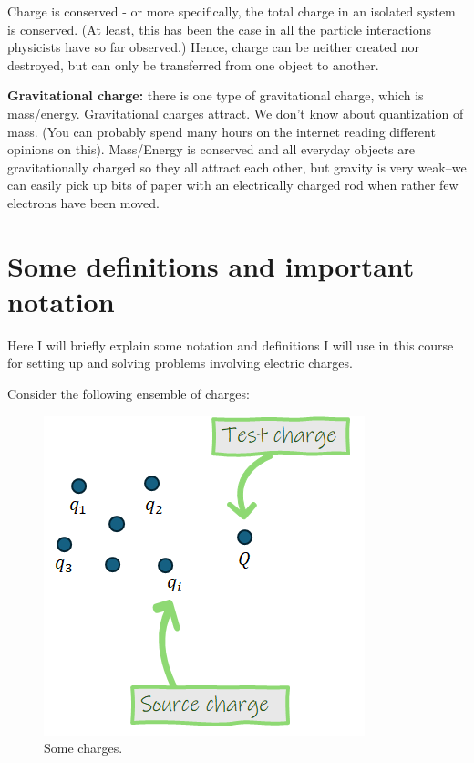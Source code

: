 \documentclass[
  letterpaper,
  DIV=11,
  numbers=noendperiod]{scrreprt}
\begin{document}
Charge is conserved - or more specifically, the total charge in an
isolated system is conserved. (At least, this has been the case in all
the particle interactions physicists have so far observed.) Hence,
charge can be neither created nor destroyed, but can only be transferred
from one object to another.

\textbf{Gravitational charge:} there is one type of gravitational
charge, which is mass/energy. Gravitational charges attract. We don't
know about quantization of mass. (You can probably spend many hours on
the internet reading different opinions on this). Mass/Energy is
conserved and all everyday objects are gravitationally charged so they
all attract each other, but gravity is very weak--we can easily pick up
bits of paper with an electrically charged rod when rather few electrons
have been moved.

\section{Some definitions and important
notation}\label{some-definitions-and-important-notation}

Here I will briefly explain some notation and definitions I will use in
this course for setting up and solving problems involving electric
charges.

Consider the following ensemble of charges:

\begin{figure}[H]

{\centering \includegraphics{Figures/sourcetest_definitions.png}

}

\caption{Some charges.}

\end{figure}%
\end{document}
